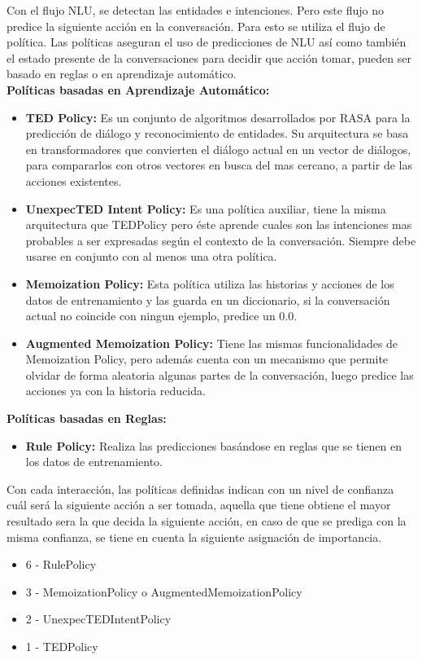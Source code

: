 Con el flujo NLU, se detectan las entidades e intenciones. Pero este flujo no predice la siguiente
acción en la
conversación. Para esto se utiliza el flujo de política. Las políticas aseguran el uso de
predicciones de NLU así como
también el estado presente de la conversaciones para decidir que acción tomar, pueden ser basado en
reglas o en aprendizaje automático.\\
\textbf{Políticas basadas en Aprendizaje Automático:}
\begin{itemize}
	\item \textbf{TED Policy:}
	      Es un conjunto de algoritmos desarrollados por RASA para la predicción de diálogo y
	      reconocimiento de entidades. Su arquitectura se basa en transformadores que convierten el diálogo
	      actual en un vector de diálogos, para compararlos con otros vectores en busca del mas cercano, a
	      partir de las acciones existentes.\cite{ConversationalAIwithRasa}
	\item \textbf{UnexpecTED Intent Policy:} Es una política auxiliar, tiene la misma arquitectura
	      que TEDPolicy pero éste aprende cuales son las intenciones mas probables a ser expresadas según el
	      contexto de la conversación. Siempre debe usarse en conjunto con al menos una otra
	      política.\cite{UnexpecTED}
	\item \textbf{Memoization Policy: }Esta política utiliza las historias y acciones de los datos
	      de entrenamiento y las guarda en un diccionario, si la conversación actual no coincide con ningun
	      ejemplo, predice un 0.0.\cite{MemoizationPolicy}
	\item \textbf{Augmented Memoization Policy: } Tiene las mismas funcionalidades de Memoization
	      Policy, pero además cuenta con un mecanismo que permite olvidar de forma aleatoria algunas partes
	      de la conversación, luego predice las acciones ya con la historia
	      reducida.\cite{AugmentedMemoizationPolicy}
\end{itemize}
\textbf{Políticas basadas en Reglas:}
\begin{itemize}
	\item \textbf{Rule Policy:} Realiza las predicciones basándose en reglas que se tienen en los
	      datos de entrenamiento.
\end{itemize}
Con cada interacción, las políticas definidas indican con un nivel de confianza cuál será la
siguiente acción a ser tomada, aquella que tiene obtiene el mayor resultado sera la que decida la
siguiente acción, en caso de que se prediga con la misma confianza, se tiene en cuenta la siguiente
asignación de importancia.
\begin{itemize}
	\item 6 - RulePolicy
	\item 3 - MemoizationPolicy o AugmentedMemoizationPolicy
	\item 2 -  UnexpecTEDIntentPolicy
	\item 1 - TEDPolicy
\end{itemize}

